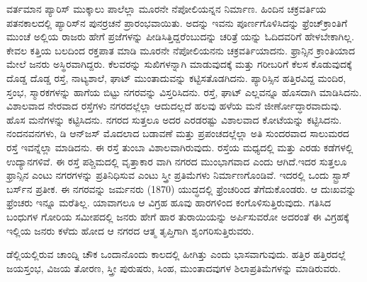 ವರ್ತಮಾನ ಪ್ಯಾರಿಸ್​ ಮುಕ್ಕಾಲು ಪಾಲೆಲ್ಲಾ ಮೂರನೇ ನೆಪೋಲಿಯನ್ನನ ನಿರ್ಮಾಣ. ಹಿಂದಿನ ಚಕ್ರವರ್ತಿಯ ಪತನಕಾಲದಲ್ಲಿ ಪ್ಯಾರಿಸ್​ನ ಪುನರ್ರಚನೆ ಪ್ರಾರಂಭವಾಯಿತು. ಅದನ್ನು ಇವನು ಪೂರ್ಣಗೊಳಿಸಿದನ್ನು ಫ್ರೆಂಚ್​ ಕ್ರಾಂತಿಗೆ ಮುಂಚೆ ಅಲ್ಲಿಯ ರಾಜರು ಹೇಗೆ ಪ್ರಜೆಗಳನ್ನು ಪೀಡಿಸಿತ್ತಿದ್ದರೆಂಬುದನ್ನು ಚರಿತ್ರೆ ಯನ್ನು ಓದಿದವರಿಗೆ ಹೇಳಬೇಕಾಗಿಲ್ಲ. ಕೇವಲ ಕತ್ತಿಯ ಬಲದಿಂದ ರಕ್ತಪಾತ ಮಾಡಿ ಮೂರನೇ ನೆಪೋಲಿಯನನು ಚಕ್ರವರ್ತಿಯಾದನು. ಫ್ರಾನ್ಸಿನ ಕ್ರಾಂತಿಯಾದ ಮೇಲೆ ಜನರು ಅಸ್ಥಿರವಾಗಿದ್ದರು. ಕೆಲವರನ್ನು ಸುಖಿಗಳನ್ನಾಗಿ ಮಾಡುವುದಕ್ಕೆ ಮತ್ತು ಗರೀಬರಿಗೆ ಕೆಲಸ ಕೊಡುವುದಕ್ಕೆ ದೊಡ್ಡ ದೊಡ್ಡ ರಸ್ತೆ, ನಾಟ್ಯಶಾಲೆ, ಘಾಟ್​ ಮುಂತಾದುವನ್ನು ಕಟ್ಟಿಸತೊಡಗಿದನು. ಪ್ಯಾರಿಸ್ಸಿನ ಹತ್ತಿರವಿದ್ದ ಮಂದಿರ, ಸ್ತಂಭ, ಸ್ಮಾರಕಗಳನ್ನು ಹಾಗೆಯ ಬಿಟ್ಟು ನಗರವನ್ನು ವಿಸ್ತರಿಸಿದನು. ರಸ್ತೆ, ಘಾಟ್​ ಎಲ್ಲವನ್ನೂ ಹೊಸದಾಗಿ ಮಾಡಿಸಿದನು. ವಿಶಾಲವಾದ ನೇರವಾದ ರಸ್ತೆಗಳು ನಗರದಲ್ಲೆಲ್ಲಾ ಆದುದಲ್ಲದೆ ಹಲವು ಹಳೆಯ ಮನೆ ಜೀರ್ಣೋದ್ಧಾರವಾದುವು. ಹೊಸ ಮನೆಗಳನ್ನು ಕಟ್ಟಿಸಿದನು. ನಗರದ ಸುತ್ತಲೂ ಅದರ ಎರಡರಷ್ಟು ವಿಶಾಲವಾದ ಕೋಟೆಯನ್ನು ಕಟ್ಟಿಸಿದನು. ನಂದನವನಗಳು, ಡಿ ಆನ್​ಜಸ್​ ಮೊದಲಾದ ಬಡಾವಣೆ ಮತ್ತು ಪ್ರಪಂಚದಲ್ಲೆಲ್ಲಾ ಅತಿ ಸುಂದರವಾದ ಸಾಲುಮರದ ರಸ್ತೆ  ಇವನ್ನೆಲ್ಲಾ ಮಾಡಿದನು. ಈ ರಸ್ತೆ ತುಂಬಾ ವಿಶಾಲವಾಗಿರುವುದು. ರಸ್ತೆಯ ಮಧ್ಯದಲ್ಲಿ ಮತ್ತು ಎರಡು ಕಡೆಗಳಲ್ಲಿ ಉದ್ಯಾನಗಳಿವೆ. ಈ ರಸ್ತೆ ಪಶ್ಚಿಮದಲ್ಲಿ ವೃತ್ತಾಕಾರ ವಾಗಿ ನಗರದ ಮುಂಭಾಗವಾದ  ಎಂದು ಆಗಿದೆ.ಇದರ ಸುತ್ತಲೂ ಫ್ರಾನ್ಸಿನ ಎಂಟು ನಗರಗಳನ್ನು ಪ್ರತಿನಿಧಿಸುವ ಎಂಟು ಸ್ತ್ರೀ ಪ್ರತಿಮೆಗಳು ನಿರ್ಮಾಣಗೊಂಡಿವೆ. ಇದರಲ್ಲಿ ಒಂದು ಸ್ಟ್ರಾಸ್​ ಬರ್ಸ್​ನ ಪ್ರತೀಕ. ಈ ನಗರವನ್ನು ಜರ್ಮನರು (1870) ಯುದ್ಧದಲ್ಲಿ ಫ್ರೆಂಚರಿಂದ ತೆಗೆದುಕೊಂಡರು. ಆ ದುಃಖವನ್ನು ಫ್ರೆಂಚರು ಇನ್ನೂ ಮರೆತಿಲ್ಲ. ಯಾವಾಗಲೂ ಆ ವಿಗ್ರಹ ಹೂವು ಹಾರಗಳಿಂದ ಕಂಗೊಳಿಸುತ್ತಿರುವುದು. ಗತಿಸಿದ ಬಂಧುಗಳ ಗೋರಿಯ ಸಮೀಪದಲ್ಲಿ ಜನರು ಹೇಗೆ ಹಾರ ತುರಾಯಿಯನ್ನು ಅರ್ಪಿಸುವರೋ ಅದರಂತೆ ಈ ವಿಗ್ರಹಕ್ಕೆ ಇಲ್ಲಿಯ ಜನರು ಕಳೆದು ಹೋದ ಆ ನಗರದ ಆತ್ಮ ತೃಪ್ತಿಗಾಗಿ ಶೃಂಗರಿಸುತ್ತಿರುವರು.

ಡೆಲ್ಲಿಯಲ್ಲಿರುವ ಚಾಂದ್ನಿ ಚೌಕ ಒಂದಾನೊಂದು ಕಾಲದಲ್ಲಿ ಹೀಗಿತ್ತು ಎಂದು ಭಾಸವಾಗುವುದು. ಹತ್ತಿರ ಹತ್ತಿರದಲ್ಲೆ ಜಯಸ್ತಂಭ, ವಿಜಯ ತೋರಣ, ಸ್ತ್ರೀ ಪುರುಷರು, ಸಿಂಹ, ಮುಂತಾದವುಗಳ ಶಿಲಾಪ್ರತಿಮೆಗಳನ್ನು ಮಾಡಿರುವರು.

